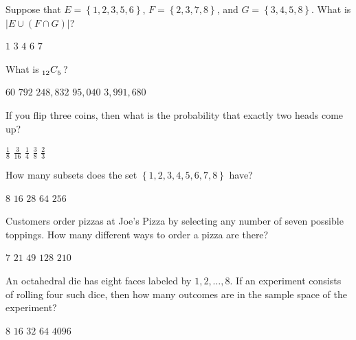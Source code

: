 \documentclass[answers,12pt]{exam}
\newcommand\ncr[2]{\tensor[_{#1}]C{_{#2}}}
\begin{document}
\begin{questions}
\question Suppose that $E=\left\{1,2,3,5,6\right\}$,
$F=\left\{2,3,7,8\right\}$, and $G=\left\{3,4,5,8\right\}$.
What is $\left|E\cup\left(F\cap G\right)\right|$?\\
\begin{oneparchoices}
\choice $1$
\choice $3$ %
\choice $4$
\correctchoice $6$
\choice $7$
\end{oneparchoices}

\question What is $\ncr{12}{5}$?\\
\begin{oneparchoices}
\choice $60$ %
\correctchoice $792$
\choice $248,832$ %
\choice $95,040$ %
\choice $3,991,680$ %
\end{oneparchoices}

\question If you flip three coins, then what is the probability
that exactly two heads come up?\\
\begin{oneparchoices}
\choice $\frac{1}{8}$ %
\choice $\frac{3}{16}$ %
\choice $\frac{1}{4}$ %
\correctchoice $\frac{3}{8}$
\choice $\frac{2}{3}$ %
\end{oneparchoices}

\question How many subsets does the set
$\left\{1,2,3,4,5,6,7,8\right\}$ have?\\
\begin{oneparchoices}
\choice $8$ %
\choice $16$ %
\choice $28$ %
\choice $64$ %
\correctchoice $256$
\end{oneparchoices}

\question Customers order pizzas at Joe's Pizza
by selecting any number of seven possible toppings.
How many different ways to order a pizza are there?\\
\begin{oneparchoices}
\choice $7$ %
\choice $21$ %
\choice $49$ %
\correctchoice $128$
\choice $210$ %
\end{oneparchoices}

\question An octahedral die has eight faces labeled by $1,2,\ldots,8$.
If an experiment consists of rolling four such dice, then how
many outcomes are in the sample space of the experiment?\\
\begin{oneparchoices}
\choice $8$ %
\choice $16$
\choice $32$ %
\choice $64$ %
\correctchoice $4096$
\end{oneparchoices}


\end{questions}
\end{document}
